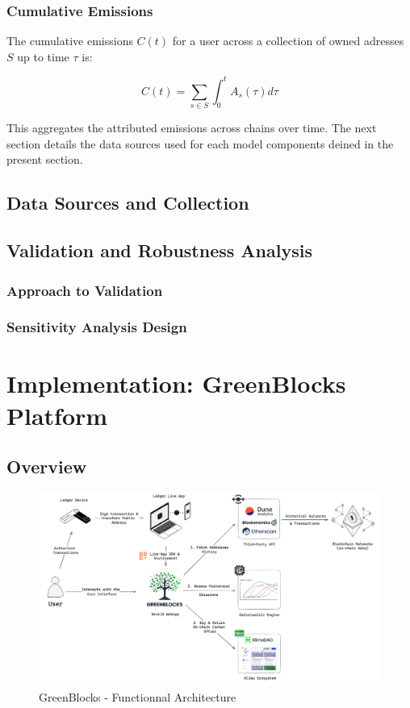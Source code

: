 \documentclass[11pt]{report}
\begin{document}
\subsection*{Cumulative Emissions}

The cumulative emissions $C(t)$ for a user across a collection of owned adresses $S$ up to time $\tau$ is:

\begin{equation}
    C(t) = \sum_{s \in S} \int_{0}^{t} A_s(\tau) d\tau
\end{equation}

This aggregates the attributed emissions across chains over time. The next section details the data sources used for each model components deined in the present section.


\section{Data Sources and Collection}
\section{Validation and Robustness Analysis}
\subsection{Approach to Validation}
\subsection{Sensitivity Analysis Design}

\chapter{Implementation: GreenBlocks Platform}
\section{Overview}
\begin{figure}[h!]
    \centering
    \centerline{\includegraphics[scale=0.08]{figures/functionnal architecture.png}}
    \caption{GreenBlocks - Functionnal Architecture}
    \label{fig:functionnal_architecture}
\end{figure}
\end{document}

